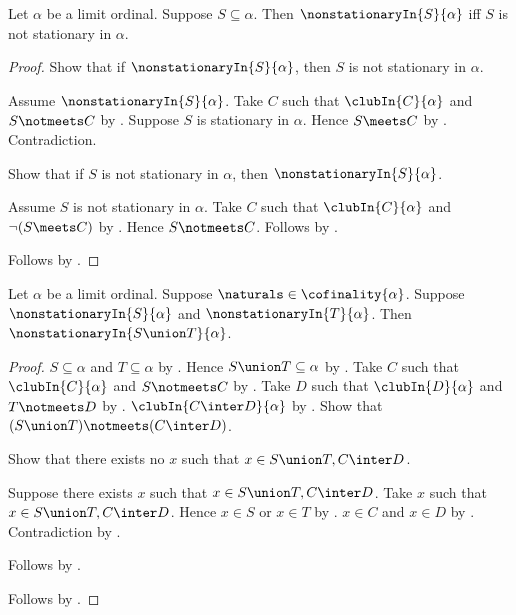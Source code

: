 \begin{proposition}\label{nonstationary_iff_not_stationary}
    Let $\alpha$ be a limit ordinal.
    Suppose $S\subseteq\alpha$.
    Then $\nonstationaryIn{S}{\alpha}$ iff
        $S$ is not stationary in $\alpha$.
\end{proposition}
\begin{proof}
    Show that if $\nonstationaryIn{S}{\alpha}$, then
        $S$ is not stationary in $\alpha$.
    \begin{subproof}
        Assume $\nonstationaryIn{S}{\alpha}$.
        Take $C$ such that $\clubIn{C}{\alpha}$ and $S\notmeets C$
            by .
        Suppose $S$ is stationary in $\alpha$.
        Hence $S\meets C$ by .
        Contradiction.
    \end{subproof}
    Show that if $S$ is not stationary in $\alpha$, then
        $\nonstationaryIn{S}{\alpha}$.
    \begin{subproof}
        Assume $S$ is not stationary in $\alpha$.
        Take $C$ such that $\clubIn{C}{\alpha}$ and
            $\lnot(S\meets C)$ by .
        Hence $S\notmeets C$.
        Follows by .
    \end{subproof}
    Follows by \auto.
\end{proof}

\begin{proposition}\label{nonstationary_union}
    Let $\alpha$ be a limit ordinal.
    Suppose $\naturals\in\cofinality{\alpha}$.
    Suppose $\nonstationaryIn{S}{\alpha}$ and
        $\nonstationaryIn{T}{\alpha}$.
    Then $\nonstationaryIn{S\union T}{\alpha}$.
\end{proposition}
\begin{proof}
    $S\subseteq\alpha$ and $T\subseteq\alpha$
        by .
    Hence $S\union T\subseteq\alpha$ by .
    Take $C$ such that $\clubIn{C}{\alpha}$ and $S\notmeets C$
        by .
    Take $D$ such that $\clubIn{D}{\alpha}$ and $T\notmeets D$
        by .
    $\clubIn{C\inter D}{\alpha}$ by .
    Show that $(S\union T)\notmeets(C\inter D)$.
    \begin{subproof}
        Show that there exists no $x$ such that
            $x\in S\union T,C\inter D$.
        \begin{subproof}
            Suppose there exists $x$ such that
                $x\in S\union T,C\inter D$.
            Take $x$ such that $x\in S\union T,C\inter D$.
            Hence $x\in S$ or $x\in T$ by .
            $x\in C$ and $x\in D$
                by .
            Contradiction by .
        \end{subproof}
        Follows by .
    \end{subproof}
    Follows by .
\end{proof}

